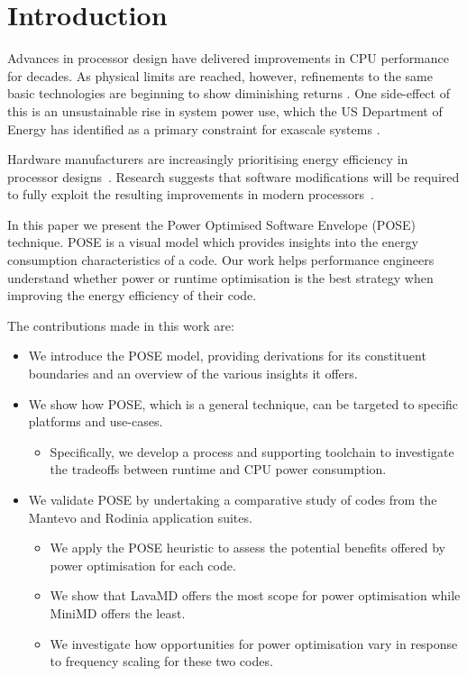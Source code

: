 \section{Introduction}
Advances in processor design have delivered improvements in CPU performance for decades. As physical limits are reached, however, refinements to the same basic technologies are beginning to show diminishing returns \cite{esmaeilzadeh:2011aa}. One side-effect of this is an unsustainable rise in system power use, which the US Department of Energy has identified as a primary constraint for exascale systems \cite{shalf:2011aa}.

Hardware manufacturers are increasingly prioritising energy efficiency in processor designs~\cite{kurd:2014aa}. 
Research suggests that software modifications will be required to fully exploit the resulting improvements in modern processors~\cite{shao:2013aa}.

In this paper we present the Power Optimised Software Envelope (POSE) technique.
POSE is a visual model which provides insights into the energy consumption characteristics of a code.
Our work helps performance engineers understand whether power or runtime optimisation is the best strategy when improving the energy efficiency of their code.

\medskip \noindent
The contributions made in this work are:
\begin{itemize}
  \item We introduce the POSE model, providing derivations for its constituent boundaries and an overview of the various insights it offers.
  \item We show how POSE, which is a general technique, can be targeted to specific platforms and use-cases. 
  \begin{itemize}
    \item Specifically, we develop a process and supporting toolchain to investigate the tradeoffs between runtime and CPU power consumption.
  \end{itemize}
  \item We validate POSE by undertaking a comparative study of codes from the Mantevo and Rodinia application suites.
  \begin{itemize}
    \item We apply the POSE heuristic to assess the potential benefits offered by power optimisation for each code.
    \item We show that LavaMD offers the most scope for power optimisation while MiniMD offers the least.
    \item We investigate how opportunities for power optimisation vary in response to frequency scaling for these two codes.
  \end{itemize}
\end{itemize}

